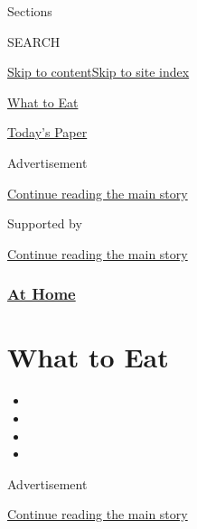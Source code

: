 Sections

SEARCH

\protect\hyperlink{site-content}{Skip to
content}\protect\hyperlink{site-index}{Skip to site index}

\href{https://www.nytimes.com/spotlight/what-to-eat}{What to Eat}

\href{https://myaccount.nytimes.com/auth/login?response_type=cookie\&client_id=vi}{}

\href{https://www.nytimes.com/section/todayspaper}{Today's Paper}

Advertisement

\protect\hyperlink{after-top}{Continue reading the main story}

Supported by

\protect\hyperlink{after-sponsor}{Continue reading the main story}

\hypertarget{at-home}{%
\subsubsection{\texorpdfstring{\href{/spotlight/at-home}{At
Home}}{At Home}}\label{at-home}}

\hypertarget{what-to-eat}{%
\section{What to Eat}\label{what-to-eat}}

\begin{itemize}
\item
\item
\item
\item
\end{itemize}

Advertisement

\protect\hyperlink{after-subheader}{Continue reading the main story}

